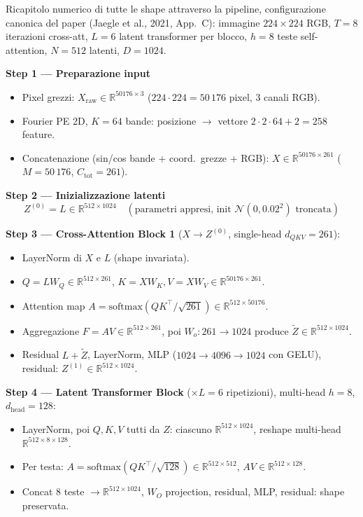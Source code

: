 \documentclass[
  11pt,
]{article}
\begin{document}
\begin{notabox}[title={\textbf{Esempio end-to-end: forward pass su un'immagine ImageNet}}]
Ricapitolo numerico di tutte le shape attraverso la pipeline, configurazione canonica del paper (Jaegle et al., 2021, App.~C): immagine $224 \times 224$ RGB, $T=8$ iterazioni cross-att, $L=6$ latent transformer per blocco, $h=8$ teste self-attention, $N=512$ latenti, $D=1024$.

\textbf{Step 1 --- Preparazione input}
\begin{itemize}\setlength\itemsep{0.1em}
\item Pixel grezzi: $X_{\text{raw}} \in \mathbb{R}^{50176 \times 3}$ ($224 \cdot 224 = 50\,176$ pixel, 3 canali RGB).
\item Fourier PE 2D, $K = 64$ bande: posizione $\to$ vettore $2 \cdot 2 \cdot 64 + 2 = 258$ feature.
\item Concatenazione (sin/cos bande + coord.\ grezze + RGB): $X \in \mathbb{R}^{50176 \times 261}$ ($M = 50\,176$, $C_{\text{tot}} = 261$).
\end{itemize}

\textbf{Step 2 --- Inizializzazione latenti}
\[ Z^{(0)} = L \in \mathbb{R}^{512 \times 1024} \quad (\text{parametri appresi, init }\mathcal{N}(0, 0.02^2) \text{ troncata}) \]

\textbf{Step 3 --- Cross-Attention Block 1} ($X \to Z^{(0)}$, single-head $d_{QKV}=261$):
\begin{itemize}\setlength\itemsep{0.1em}
\item LayerNorm di $X$ e $L$ (shape invariata).
\item $Q = L W_Q \in \mathbb{R}^{512 \times 261}$, \quad $K = X W_K, V = X W_V \in \mathbb{R}^{50176 \times 261}$.
\item Attention map $A = \mathrm{softmax}(QK^\top / \sqrt{261}) \in \mathbb{R}^{512 \times 50176}$.
\item Aggregazione $F = AV \in \mathbb{R}^{512 \times 261}$, poi $W_o: 261 \to 1024$ produce $\widetilde Z \in \mathbb{R}^{512 \times 1024}$.
\item Residual $L + \widetilde Z$, LayerNorm, MLP ($1024 \to 4096 \to 1024$ con GELU), residual: $Z^{(1)} \in \mathbb{R}^{512 \times 1024}$.
\end{itemize}

\textbf{Step 4 --- Latent Transformer Block} ($\times L = 6$ ripetizioni), multi-head $h=8$, $d_{\text{head}}=128$:
\begin{itemize}\setlength\itemsep{0.1em}
\item LayerNorm, poi $Q, K, V$ tutti da $Z$: ciascuno $\mathbb{R}^{512 \times 1024}$, reshape multi-head $\mathbb{R}^{512 \times 8 \times 128}$.
\item Per testa: $A = \mathrm{softmax}(QK^\top/\sqrt{128}) \in \mathbb{R}^{512 \times 512}$, $AV \in \mathbb{R}^{512 \times 128}$.
\item Concat 8 teste $\to \mathbb{R}^{512 \times 1024}$, $W_O$ projection, residual, MLP, residual: shape preservata.
\end{itemize}


\end{notabox}
\end{document}
